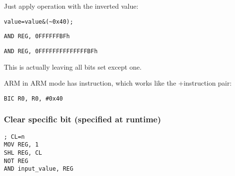 Just apply \AND operation with the inverted value:

\begin{lstlisting}[caption=\CCpp]
value=value&(~0x40);
\end{lstlisting}

\begin{lstlisting}[caption=x86]
AND REG, 0FFFFFFBFh
\end{lstlisting}

\begin{lstlisting}[caption=x64]
AND REG, 0FFFFFFFFFFFFFFBFh
\end{lstlisting}

This is actually leaving all bits set except one.


ARM in ARM mode has \BIC instruction, which works like the \NOT+\AND instruction pair:

\begin{lstlisting}[caption=ARM (\ARMMode)]
BIC R0, R0, #0x40
\end{lstlisting}

\subsubsection{
Clear specific bit (specified at runtime)}



\begin{lstlisting}[caption=x86]
; CL=n
MOV REG, 1
SHL REG, CL
NOT REG
AND input_value, REG
\end{lstlisting}
